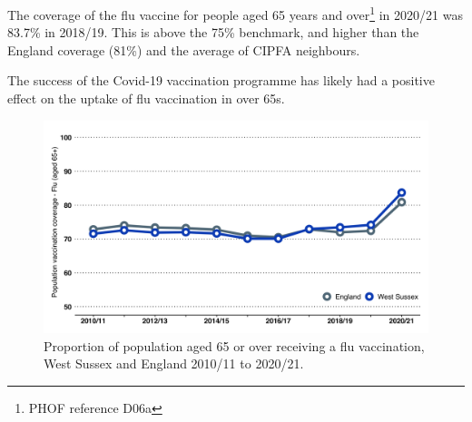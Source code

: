The coverage of the flu vaccine for people aged 65 years and over\footnote{PHOF reference D06a} in 2020/21 was 83.7\% in 2018/19. This is above the 75\% benchmark, and higher than the England coverage (81\%) and the average of CIPFA neighbours.

The success of the Covid-19 vaccination programme has likely had a positive effect on the uptake of flu vaccination in over 65s.

\begin{figure}
    \caption{Proportion of population aged 65 or over receiving a flu vaccination, West Sussex and England 2010/11 to 2020/21.}\label{fig:over65fluvax}
    \includegraphics[width=\linewidth]{images/65over_vaccine_flu.png}
\end{figure}





